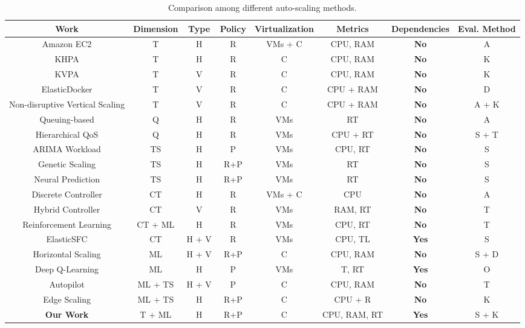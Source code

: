 \documentclass[conference]{IEEEtran}
\begin{document}
\begin{table}[h]
\centering
\caption{Comparison among different auto-scaling methods.}
\label{tab:comparison_methods}
\begin{tabular}{|c|c|c|c|c|c|c|c|}
\hline
\textbf{Work} & \textbf{Dimension} & \textbf{Type} & \textbf{Policy} & \textbf{Virtualization} & \textbf{Metrics} & \textbf{Dependencies} & \textbf{Eval. Method} \\
\hline
Amazon EC2 \cite{aws2021autoscaling} & T & H & R & VMs + C & CPU, RAM & \textbf{No} & A \\
\hline
KHPA \cite{kubernetesHPA} & T & H & R & C & CPU, RAM & \textbf{No} & K \\
\hline
KVPA \cite{kubernetesVPA} & T & V & R & C & CPU, RAM & \textbf{No} & K \\
\hline
ElasticDocker \cite{alDhuraibi2017elasticDocker} & T & V & R & C & CPU + RAM & \textbf{No} & D \\
\hline
Non-disruptive Vertical Scaling \cite{rattihalli2019verticalScaling} & T & V & R & C & CPU + RAM & \textbf{No} & A + K \\
\hline
Queuing-based \cite{gergin2014performance} & Q & H & R & VMs & RT & \textbf{No} & A \\
\hline
Hierarchical QoS \cite{danilo2018hierarchical} & Q & H & R & VMs & CPU + RT & \textbf{No} & S + T \\
\hline
ARIMA Workload \cite{calheiros2014arima} & TS & H & P & VMs & CPU, RT & \textbf{No} & S \\
\hline
Genetic Scaling \cite{messias2016genetic} & TS & H & R+P & VMs & RT & \textbf{No} & S \\
\hline
Neural Prediction \cite{kumar2018neural} & TS & H & R+P & VMs & RT & \textbf{No} & S \\
\hline
Discrete Controller \cite{baresi2016controller} & CT & H & R & VMs + C & CPU & \textbf{No} & A \\
\hline
Hybrid Controller \cite{farokhi2016vertical} & CT & V & R & VMs & RAM, RT & \textbf{No} & T \\
\hline
Reinforcement Learning \cite{nouri2019autonomic} & CT + ML & H & R & VMs & CPU, RT & \textbf{No} & T \\
\hline
ElasticSFC \cite{toosi2019elasticsfc} & CT & H + V & R & VMs & CPU, TL & \textbf{Yes} & S \\
\hline
Horizontal Scaling \cite{rossi2019horizontal} & ML & H + V & R+P & C & CPU, RAM & \textbf{No} & S + D \\
\hline
Deep Q-Learning \cite{lee2020deep} & ML & H & P & VMs & T, RT & \textbf{Yes} & O \\
\hline
Autopilot \cite{rzadka2020autopilot} & ML + TS & H + V & P & C & CPU, RAM & \textbf{No} & T \\
\hline
Edge Scaling \cite{toka2021scaling} & ML + TS & H & R+P & C & CPU + R & \textbf{No} & K \\
\hline
\textbf{Our Work} & T + ML & H & R+P & C & CPU, RAM, RT & \textbf{Yes} & S + K \\
\hline
\end{tabular}


\end{table}
\end{document}
